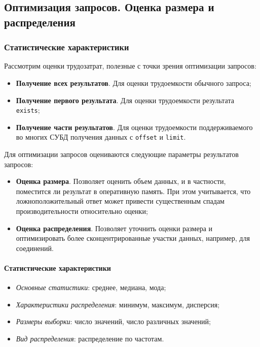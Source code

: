 \subsection{Оптимизация запросов. Оценка размера и распределения}

\subsubsection{Статистические характеристики}

Рассмотрим оценки трудозатрат, полезные с точки зрения оптимизации запросов:

\begin{itemize}
	\item \textbf{Получение всех результатов}. Для оценки трудоемкости обычного запроса;
	\item \textbf{Получение первого результата}. Для оценки трудоемкости результата
	      \texttt{exists};
	\item \textbf{Получение части результатов}. Для оценки трудоемкости поддерживаемого во многих
	      СУБД получения данных с \texttt{offset} и \texttt{limit}.
\end{itemize}

Для оптимизации запросов оцениваются следующие параметры результатов запросов:

\begin{itemize}
	\item \textbf{Оценка размера}. Позволяет оценить объем данных, и в частности, поместится ли
	      результат в оперативную память. При этом учитывается, что ложноположительный ответ может привести
	      существенным спадам производительности относительно оценки;
	\item \textbf{Оценка распределения}. Позволяет уточнить оценки размера и оптимизировать более
	      сконцентрированные участки данных, например, для соединений.
\end{itemize}

\paragraph{Статистические характеристики}

\begin{itemize}
	\item \textit{Основные статистики}: среднее, медиана, мода;
	\item \textit{Характеристики распределения}: минимум, максимум, дисперсия;
	\item \textit{Размеры выборки}: число значений, число различных значений;
	\item \textit{Вид распределения}: распределение по частотам.
\end{itemize}

